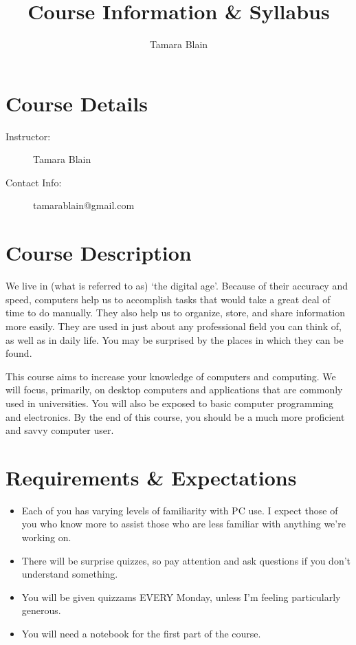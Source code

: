 \documentclass[11pt]{article}
\begin{document}
\title{Course Information \& Syllabus}
\author{Tamara Blain}
\date{}
\maketitle
\thispagestyle{fancy}


\section{Course Details}
\begin{description}
\item[Instructor:] Tamara Blain
\item[Contact Info:]  tamarablain@gmail.com
\end{description}


\section{Course Description}
We live in (what is referred to as) `the digital age'.  Because of their accuracy and speed, computers help us to accomplish tasks that would take a great deal of time to do manually.  They also help us to organize, store, and share information more easily.  They are used in just about any professional field you can think of, as well as in daily life.  You may be surprised by the places in which they can be found.

This course aims to increase your knowledge of computers and computing.  We will focus, primarily, on desktop computers and applications that are commonly used in universities.  You will also be exposed to basic computer programming and electronics.  By the end of this course, you should be a much more proficient and savvy computer user.


\section{Requirements \& Expectations}

\begin{itemize}\itemsep.5pt
\item Each of you has varying levels of familiarity with PC use.  I expect those of you who know more to assist those who are less familiar with anything we're working on.
\item There will be surprise quizzes, so pay attention and ask questions if you don't understand something.
\item You will be given quizzams EVERY Monday, unless I'm feeling particularly generous.
\item You will need a notebook for the first part of the course.
\end{itemize}
\end{document}
